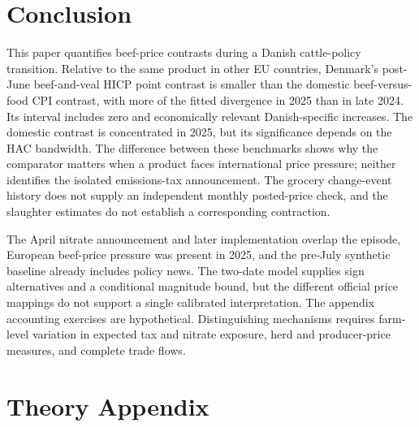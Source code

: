 \documentclass[11pt]{article}
\begin{document}
\clearpage
\section{Conclusion}\label{sec:conclusion}
This paper quantifies beef-price contrasts during a Danish cattle-policy transition. Relative to the same product in other EU countries, Denmark's post-June beef-and-veal HICP point contrast is smaller than the domestic beef-versus-food CPI contrast, with more of the fitted divergence in 2025 than in late 2024. Its interval includes zero and economically relevant Danish-specific increases. The domestic contrast is concentrated in 2025, but its significance depends on the HAC bandwidth. The difference between these benchmarks shows why the comparator matters when a product faces international price pressure; neither identifies the isolated emissions-tax announcement. The grocery change-event history does not supply an independent monthly posted-price check, and the slaughter estimates do not establish a corresponding contraction.

The April nitrate announcement and later implementation overlap the episode, European beef-price pressure was present in 2025, and the pre-July synthetic baseline already includes policy news. The two-date model supplies sign alternatives and a conditional magnitude bound, but the different official price mappings do not support a single calibrated interpretation. The appendix accounting exercises are hypothetical. Distinguishing mechanisms requires farm-level variation in expected tax and nitrate exposure, herd and producer-price measures, and complete trade flows.

\clearpage



\clearpage
\appendix
\renewcommand{\thetable}{A\arabic{table}}\renewcommand{\thefigure}{A\arabic{figure}}\renewcommand{\theequation}{A\arabic{equation}}\setcounter{table}{0}\setcounter{figure}{0}\setcounter{equation}{0}
\section{Theory Appendix}\label{app:theory}
\end{document}

